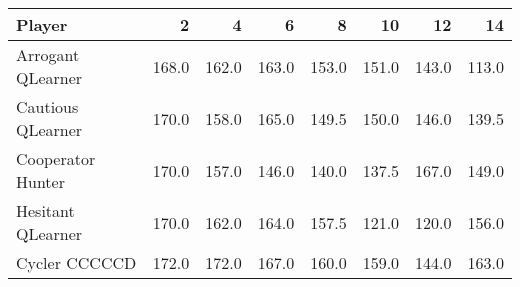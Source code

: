 \begin{tabular}{lrrrrrrr}
\toprule
            Player &      2 &      4 &      6 &      8 &     10 &     12 &     14 \\
\midrule
 Arrogant QLearner &  168.0 &  162.0 &  163.0 &  153.0 &  151.0 &  143.0 &  113.0 \\
 Cautious QLearner &  170.0 &  158.0 &  165.0 &  149.5 &  150.0 &  146.0 &  139.5 \\
 Cooperator Hunter &  170.0 &  157.0 &  146.0 &  140.0 &  137.5 &  167.0 &  149.0 \\
 Hesitant QLearner &  170.0 &  162.0 &  164.0 &  157.5 &  121.0 &  120.0 &  156.0 \\
     Cycler CCCCCD &  172.0 &  172.0 &  167.0 &  160.0 &  159.0 &  144.0 &  163.0 \\
\bottomrule
\end{tabular}
